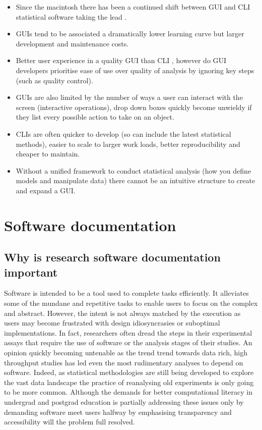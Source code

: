 \documentclass[../main.tex]{subfiles}
\begin{document}
\begin{itemize}
    \item Since the macintosh there has been a continued shift between GUI and CLI statistical software taking the lead \cite{ValeroMora2012}. 
    \item GUIs tend to be associated a dramatically lower learning curve but larger development and maintenance costs.
    \item Better user experience in a quality GUI than CLI \cite{Staggers2000}, however do GUI developers prioritise ease of use over quality of analysis by ignoring key steps (such as quality control).
    \item GUIs are also limited by the number of ways a user can interact with the screen (interactive operations), drop down boxes quickly become unwieldy if they list every possible action to take on an object. 
    \item CLIs are often quicker to develop (so can include the latest statistical methods), easier to scale to larger work loads, better reproducibility and cheaper to maintain.
    \item Without a unified framework to conduct statistical analysis (how you define models and manipulate data) there cannot be an intuitive structure to create and expand a GUI. \cite{Unwin2012}

\end{itemize}

\section{Software documentation}

\subsection{Why is research software documentation important}

Software is intended to be a tool used to complete tasks efficiently.
It alleviates some of the mundane and repetitive tasks to enable users to focus on the complex and abstract. 
However, the intent is not always matched by the execution as users may become frustrated with design idiosyncrasies or suboptimal implementations.
In fact, researchers often dread the steps in their experimental assays that require the use of software or the analysis stages of their studies.
An opinion quickly becoming untenable as the trend trend towards data rich, high throughput studies has led even the most rudimentary analyses to depend on software.
Indeed, as statistical methodologies are still being developed to explore the vast data landscape the practice of reanalysing old experiments is only going to be more common. 
Although the demands for better computational literacy in undergrad and postgrad education is partially addressing these issues only by demanding software meet users halfway by emphasising transparency and accessibility will the problem full resolved.
\end{document}

